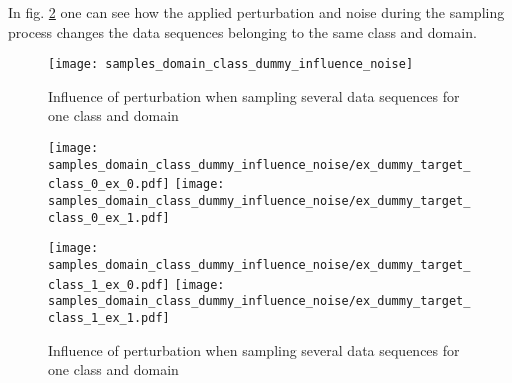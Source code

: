 In fig. \ref{fig:samples_domain_class_dummy_influence_noise} one can see how the applied perturbation and noise during the sampling process changes the data sequences belonging to the same class and domain. 


\begin{figure}[H]
  \centering
  \texttt{[image: samples\_domain\_class\_dummy\_influence\_noise]}
  \caption {Influence of perturbation when sampling several data sequences for one class and domain}
  \label{fig:samples_domain_class_dummy_influence_noise}
\end{figure}



\begin{figure}[p]
  \centering
  \texttt{[image: samples\_domain\_class\_dummy\_influence\_noise/ex\_dummy\_target\_class\_0\_ex\_0.pdf]}
  \hspace{.3cm}
  \texttt{[image: samples\_domain\_class\_dummy\_influence\_noise/ex\_dummy\_target\_class\_0\_ex\_1.pdf]}

  \vspace{.1cm}

  \texttt{[image: samples\_domain\_class\_dummy\_influence\_noise/ex\_dummy\_target\_class\_1\_ex\_0.pdf]}
  \hspace{.3cm}
  \texttt{[image: samples\_domain\_class\_dummy\_influence\_noise/ex\_dummy\_target\_class\_1\_ex\_1.pdf]}

  \caption{Influence of perturbation when sampling several data sequences for one class and domain}
  \label{fig:samples_domain_class_dummy_influence_noise}
\end{figure}
